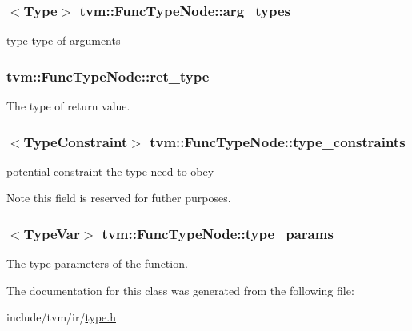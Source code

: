 \subsubsection[{\texorpdfstring{arg\+\_\+types}{arg_types}}]{$<${\bf Type}$>$ tvm\+::\+Func\+Type\+Node\+::arg\+\_\+types}\hypertarget{classtvm_1_1FuncTypeNode_abffc654ce18e472ce19725dbaf5c7316}{}\label{classtvm_1_1FuncTypeNode_abffc654ce18e472ce19725dbaf5c7316}


type type of arguments 

\subsubsection[{\texorpdfstring{ret\+\_\+type}{ret_type}}]{ tvm\+::\+Func\+Type\+Node\+::ret\+\_\+type}\hypertarget{classtvm_1_1FuncTypeNode_a4d30bd05ee4751f963daf10f0c69036d}{}\label{classtvm_1_1FuncTypeNode_a4d30bd05ee4751f963daf10f0c69036d}


The type of return value. 

\subsubsection[{\texorpdfstring{type\+\_\+constraints}{type_constraints}}]{$<${\bf Type\+Constraint}$>$ tvm\+::\+Func\+Type\+Node\+::type\+\_\+constraints}\hypertarget{classtvm_1_1FuncTypeNode_a6dd6e8ed07019caa87943ec47d065499}{}\label{classtvm_1_1FuncTypeNode_a6dd6e8ed07019caa87943ec47d065499}


potential constraint the type need to obey 

\begin{DoxyNote}{Note}
this field is reserved for futher purposes. 
\end{DoxyNote}
\subsubsection[{\texorpdfstring{type\+\_\+params}{type_params}}]{$<${\bf Type\+Var}$>$ tvm\+::\+Func\+Type\+Node\+::type\+\_\+params}\hypertarget{classtvm_1_1FuncTypeNode_acc1bb373c5851f6cec016a874f304d05}{}\label{classtvm_1_1FuncTypeNode_acc1bb373c5851f6cec016a874f304d05}


The type parameters of the function. 



The documentation for this class was generated from the following file\+:\begin{DoxyCompactItemize}
\item 
include/tvm/ir/\hyperlink{ir_2type_8h}{type.\+h}\end{DoxyCompactItemize}
